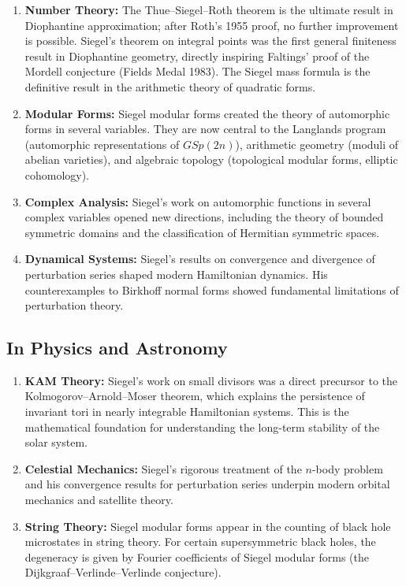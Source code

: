 \begin{enumerate}
    \item \textbf{Number Theory:} The Thue--Siegel--Roth theorem is the ultimate result in Diophantine approximation; after Roth's 1955 proof, no further improvement is possible. Siegel's theorem on integral points was the first general finiteness result in Diophantine geometry, directly inspiring Faltings' proof of the Mordell conjecture (Fields Medal 1983). The Siegel mass formula is the definitive result in the arithmetic theory of quadratic forms.
    
    \item \textbf{Modular Forms:} Siegel modular forms created the theory of automorphic forms in several variables. They are now central to the Langlands program (automorphic representations of $GSp(2n)$), arithmetic geometry (moduli of abelian varieties), and algebraic topology (topological modular forms, elliptic cohomology).
    
    \item \textbf{Complex Analysis:} Siegel's work on automorphic functions in several complex variables opened new directions, including the theory of bounded symmetric domains and the classification of Hermitian symmetric spaces.
    
    \item \textbf{Dynamical Systems:} Siegel's results on convergence and divergence of perturbation series shaped modern Hamiltonian dynamics. His counterexamples to Birkhoff normal forms showed fundamental limitations of perturbation theory.
\end{enumerate}

\subsection{In Physics and Astronomy}

\begin{enumerate}
    \item \textbf{KAM Theory:} Siegel's work on small divisors was a direct precursor to the Kolmogorov--Arnold--Moser theorem, which explains the persistence of invariant tori in nearly integrable Hamiltonian systems. This is the mathematical foundation for understanding the long-term stability of the solar system.
    
    \item \textbf{Celestial Mechanics:} Siegel's rigorous treatment of the $n$-body problem and his convergence results for perturbation series underpin modern orbital mechanics and satellite theory.
    
    \item \textbf{String Theory:} Siegel modular forms appear in the counting of black hole microstates in string theory. For certain supersymmetric black holes, the degeneracy is given by Fourier coefficients of Siegel modular forms (the Dijkgraaf--Verlinde--Verlinde conjecture).
\end{enumerate}

